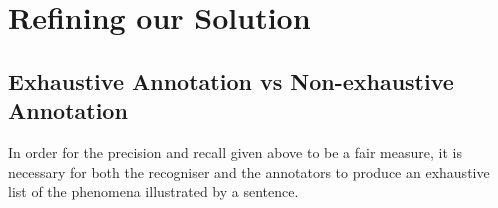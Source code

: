 \documentclass[11pt]{article}
\begin{document}
\section{Refining our Solution}

\subsection{Exhaustive Annotation vs Non-exhaustive Annotation}
In order for the precision and recall given above to be a fair measure, it is necessary for both the recogniser and the annotators to produce an exhaustive list of the phenomena illustrated by a sentence. %
%


%
    
\end{document}
